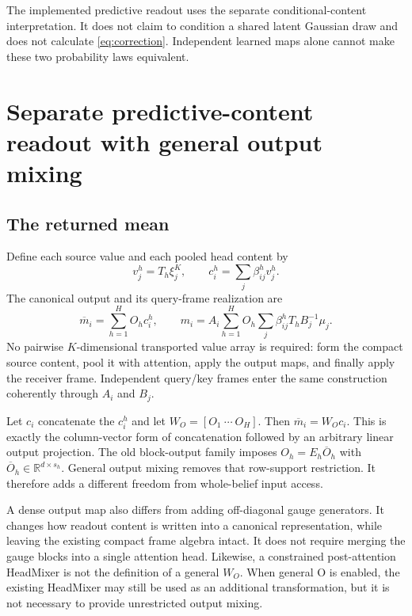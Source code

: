 \documentclass[11pt,letterpaper]{article}
\newcommand{\R}{\mathbb R}
\begin{document}
The implemented predictive readout uses the separate conditional-content interpretation. It does not claim to condition a shared latent Gaussian draw and does not calculate \eqref{eq:correction}. Independent learned maps alone cannot make these two probability laws equivalent.

\section{Separate predictive-content readout with general output mixing}
\subsection{The returned mean}
Define each source value and each pooled head content by
\begin{equation}
 v_j^h=T_h\xi_j^K,\qquad c_i^h=\sum_j\beta_{ij}^h v_j^h.
\end{equation}
The canonical output and its query-frame realization are
\begin{equation}
 \overline m_i=\sum_{h=1}^H O_h c_i^h,\qquad
 \boxed{m_i=A_i\sum_{h=1}^H O_h\sum_j\beta_{ij}^h T_hB_j^{-1}\mu_j.}
 \label{eq:main}
\end{equation}
No pairwise $K$-dimensional transported value array is required: form the compact source content, pool it with attention, apply the output maps, and finally apply the receiver frame. Independent query/key frames enter the same construction coherently through $A_i$ and $B_j$.

Let $c_i$ concatenate the $c_i^h$ and let $W_O=[O_1\ \cdots\ O_H]$. Then $\overline m_i=W_Oc_i$. This is exactly the column-vector form of concatenation followed by an arbitrary linear output projection. The old block-output family imposes $O_h=E_h\overline O_h$ with $\overline O_h\in\R^{d\times s_h}$. General output mixing removes that row-support restriction. It therefore adds a different freedom from whole-belief input access.

A dense output map also differs from adding off-diagonal gauge generators. It changes how readout content is written into a canonical representation, while leaving the existing compact frame algebra intact. It does not require merging the gauge blocks into a single attention head. Likewise, a constrained post-attention HeadMixer is not the definition of a general $W_O$. When general O is enabled, the existing HeadMixer may still be used as an additional transformation, but it is not necessary to provide unrestricted output mixing.
\end{document}
